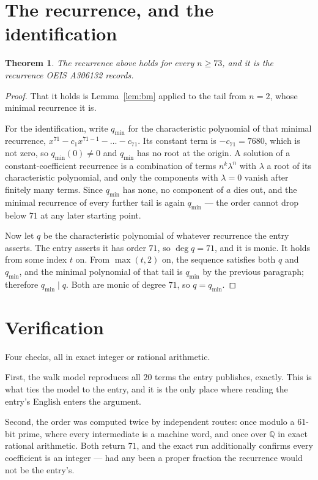 \documentclass[11pt,a4paper]{article}
\theoremstyle{plain}
\newtheorem{theorem}{Theorem}
\theoremstyle{definition}
\begin{document}
\section{The recurrence, and the identification}

\begin{theorem}
The recurrence above holds for every $n\ge73$, and it is the recurrence OEIS A306132 records.
\end{theorem}

\begin{proof}
That it holds is Lemma~\ref{lem:bm} applied to the tail from $n=2$, whose minimal
recurrence it is.

For the identification, write $q_{\min}$ for the characteristic polynomial of that minimal
recurrence, $x^{71}-c_1x^{71-1}-\dots-c_{71}$. Its constant term is
$-c_{71}=7680$, which is not zero, so $q_{\min}(0)\neq0$ and $q_{\min}$ has no
root at the origin. A solution of a constant-coefficient recurrence is a combination of terms
$n^{k}\lambda^{n}$ with $\lambda$ a root of its characteristic polynomial, and only the
components with $\lambda=0$ vanish after finitely many terms. Since $q_{\min}$ has none, no
component of $a$ dies out, and the minimal recurrence of every further tail is again
$q_{\min}$ --- the order cannot drop below $71$ at any later starting point.

Now let $q$ be the characteristic polynomial of whatever recurrence the entry asserts. The
entry asserts it has order $71$, so $\deg q=71$, and it is monic. It holds from some
index $t$ on. From $\max(t,2)$ on, the sequence satisfies both $q$ and $q_{\min}$, and
the minimal polynomial of that tail is $q_{\min}$ by the previous paragraph; therefore
$q_{\min}\mid q$. Both are monic of degree $71$, so $q=q_{\min}$.
\end{proof}

\section{Verification}

Four checks, all in exact integer or rational arithmetic.

First, the walk model reproduces all $20$ terms the entry publishes, exactly. This is
what ties the model to the entry, and it is the only place where reading the entry's English
enters the argument.

Second, the order was computed twice by independent routes: once modulo a $61$-bit prime, where
every intermediate is a machine word, and once over $\mathbb{Q}$ in exact rational arithmetic.
Both return $71$, and the exact run additionally confirms every coefficient is an integer
--- had any been a proper fraction the recurrence would not be the entry's.
\end{document}
